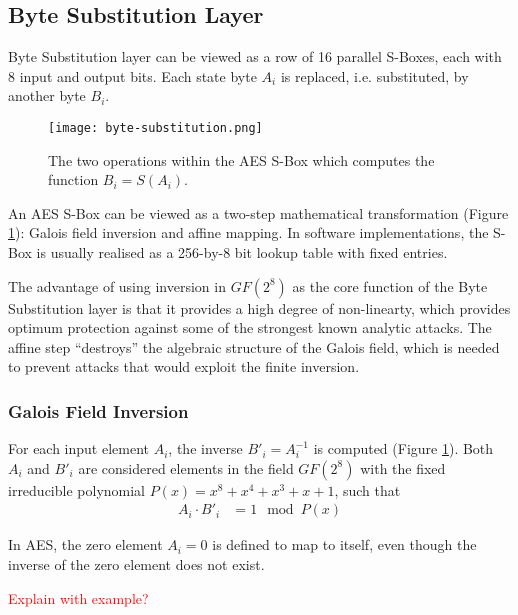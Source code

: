 \subsection{Byte Substitution Layer}
\label{sec:byte-substitution}

Byte Substitution layer can be viewed as a row of 16 parallel S-Boxes, each with 8 input and output bits. 
Each state byte $A_i$ is replaced, i.e. substituted, by another byte $B_i$.

\begin{figure}[h] %
    \centering
    \texttt{[image: byte-substitution.png]} %
    \caption{
        The two operations within the AES S-Box which computes the function $B_i = S(A_i)$.
    }
    \label{fig:byte-substitution} %
\end{figure}

An AES S-Box can be viewed as a two-step mathematical transformation (Figure \ref{fig:byte-substitution}): Galois field inversion and affine mapping.
In software implementations, the S-Box is usually realised as a 256-by-8 bit lookup table with fixed entries.

The advantage of using inversion in $GF(2^8)$ as the core function of the Byte Substitution layer is that it provides a high degree of non-linearty, which provides optimum protection against some of the strongest known analytic attacks. 
The affine step ``destroys'' the algebraic structure of the Galois field, which is needed to prevent attacks that would exploit the finite inversion.

\subsubsection{Galois Field Inversion}

For each input element $A_i$, the inverse ${B'}_i = A_i^{-1}$ is computed (Figure \ref{fig:byte-substitution}).
Both $A_i$ and ${B'}_i$ are considered elements in the field $GF(2^8)$ with the fixed irreducible polynomial $P(x) = x^8 + x^4 + x^3 + x + 1$, such that 
\begin{align}
    A_i \cdot {B'}_i &= 1 \mod P(x)
\end{align}

In AES, the zero element $A_i = 0$ is defined to map to itself, even though the inverse of the zero element does not exist.

\textcolor{red}{Explain with example?}


